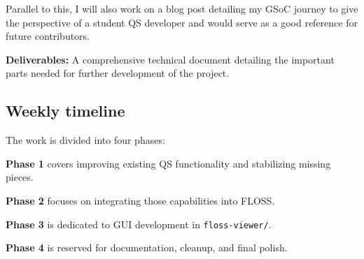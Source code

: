 \documentclass[12pt]{article}
\begin{document}
Parallel to this, I will also work on a blog post detailing my GSoC journey to give the perspective of a student QS developer and would serve as a good reference for future contributors.

\textbf{Deliverables:} A comprehensive technical document detailing the important parts needed for further development of the project.

\subsection*{Weekly timeline}
{}

The work is divided into four phases:

\colorbox{ForestGreen!10}{\textbf{Phase 1}} covers improving existing QS functionality and stabilizing missing pieces.

\colorbox{Cerulean!10}{\textbf{Phase 2}} focuses on integrating those capabilities into FLOSS.

\colorbox{Apricot!18}{\textbf{Phase 3}} is dedicated to GUI development in \texttt{floss-viewer/}.

\colorbox{Orchid!10}{\textbf{Phase 4}} is reserved for documentation, cleanup, and final polish.
\end{document}
